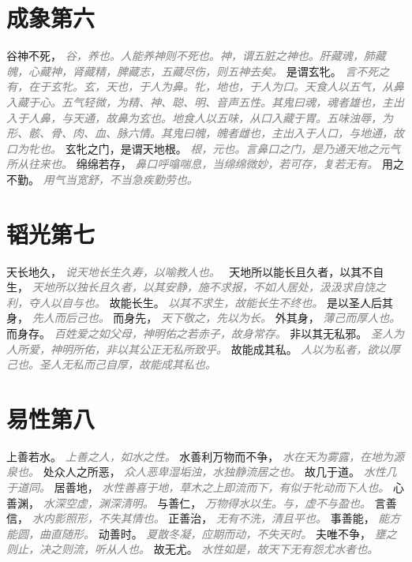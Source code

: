 \documentclass[a4paper,zihao=-4,oneside,landscape,UTF8]{ctexart}
\newcommand{\zhushi}[1]{\scriptsize{\textit{\textcolor{gray}{#1}}}\normalsize}
\begin{document}
\section{成象第六}

谷神不死，
\zhushi{谷，养也。人能养神则不死也。神，谓五脏之神也。肝藏魂，肺藏魄，心藏神，肾藏精，脾藏志，五藏尽伤，则五神去矣。}
是谓玄牝。
\zhushi{言不死之有，在于玄牝。玄，天也，于人为鼻。牝，地也，于人为口。天食人以五气，从鼻入藏于心。五气轻微，为精、神、聪、明、音声五性。其鬼曰魂，魂者雄也，主出入于人鼻，与天通，故鼻为玄也。地食人以五味，从口入藏于胃。五味浊辱，为形、骸、骨、肉、血、脉六情。其鬼曰魄，魄者雌也，主出入于人口，与地通，故口为牝也。}
玄牝之门，是谓天地根。
\zhushi{根，元也。言鼻口之门，是乃通天地之元气所从往来也。}
绵绵若存，
\zhushi{鼻口呼噏喘息，当绵绵微妙，若可存，复若无有。}
用之不勤。
\zhushi{用气当宽舒，不当急疾勤劳也。}


\section{韬光第七}

天长地久，
\zhushi{说天地长生久寿，以喻教人也。　}
天地所以能长且久者，以其不自生，
\zhushi{天地所以独长且久者，以其安静，施不求报，不如人居处，汲汲求自饶之利，夺人以自与也。}
故能长生。
\zhushi{以其不求生，故能长生不终也。}
是以圣人后其身，
\zhushi{先人而后己也。}
而身先，
\zhushi{天下敬之，先以为长。}
外其身，
\zhushi{薄己而厚人也。}
而身存。
\zhushi{百姓爱之如父母，神明佑之若赤子，故身常存。}
非以其无私邪。
\zhushi{圣人为人所爱，神明所佑，非以其公正无私所致乎。}
故能成其私。
\zhushi{人以为私者，欲以厚己也。圣人无私而己自厚，故能成其私也。}


\section{易性第八}

上善若水。
\zhushi{上善之人，如水之性。}
水善利万物而不争，
\zhushi{水在天为雾露，在地为源泉也。}
处众人之所恶，
\zhushi{众人恶卑湿垢浊，水独静流居之也。}
故几于道。
\zhushi{水性几于道同。}
居善地，
\zhushi{水性善喜于地，草木之上即流而下，有似于牝动而下人也。}
心善渊，
\zhushi{水深空虚，渊深清明。}
与善仁，
\zhushi{万物得水以生。与，虚不与盈也。}
言善信，
\zhushi{水内影照形，不失其情也。}
正善治，
\zhushi{无有不洗，清且平也。}
事善能，
\zhushi{能方能圆，曲直随形。}
动善时。
\zhushi{夏散冬凝，应期而动，不失天时。}
夫唯不争，
\zhushi{壅之则止，决之则流，听从人也。}
故无尤。
\zhushi{水性如是，故天下无有怨尤水者也。}
\end{document}
